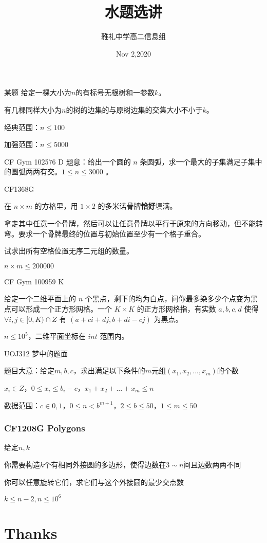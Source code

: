 \documentclass[9pt]{beamer}
\title{水题选讲}
\date{Nov 2,2020}
\author{雅礼中学高二信息组}
\begin{document}
  \maketitle
  \begin{frame}{某题}
	给定一棵大小为$n$的有标号无根树和一参数$k$。
	
  有几棵同样大小为$n$的树的边集的与原树边集的交集大小不小于$k$。

	经典范围：$n\le 100$

	加强范围：$n\le 5000$
  \end{frame}

  \begin{frame}{CF Gym 102576 D}
     题意：给出一个圆的 $n$ 条圆弧，求一个最大的子集满足子集中的圆弧两两有交。$1\le n \le 3000$ 。
  \end{frame}

  \begin{frame}{CF1368G}
    \par 在 $n\times m$ 的方格里，用 $1\times2$ 的多米诺骨牌\textbf{恰好}填满。
    \par 拿走其中任意一个骨牌，然后可以让任意骨牌以平行于原来的方向移动，但不能转弯。要求一个骨牌最终的位置与初始位置至少有一个格子重合。
    \par 试求出所有空格位置无序二元组的数量。
    \par $n\times m\le200000$ 
  \end{frame}

  \begin{frame}{CF Gym 100959 K}
    \par 给定一个二维平面上的 $n$ 个黑点，剩下的均为白点，问你最多染多少个点变为黑点可以形成一个正方形网格。一个 $K\times K$ 的正方形网格指，有实数 $a,b,c,d$ 使得 $\forall i,j\in[0,K)\cap Z$ 有 $(a+ci+dj,b+di-cj)$ 为黑点。 
    \par $n\leq 10^5$，二维平面坐标在 $int$ 范围内。
  \end{frame}

  \begin{frame}{UOJ312 梦中的题面}
    \par 题目大意：给定$m,b,c$，求出满足以下条件的$m$元组$(x_1,x_2,...,x_m)$的个数
    \par $x_i \in Z$，$0\leqslant x_i \leqslant b_{i}-c$，$x_1+x_2+...+x_m \leqslant n$
    \par 数据范围：$c\in{0,1}$，$0\leqslant n < b^{m+1}$，$2 \leqslant b \leqslant 50$，$1 \leqslant m \leqslant 50$
  \end{frame}
  
  \begin{frame}
		\frametitle{CF1208G Polygons}
		\par 给定$n,k$
		\par 你需要构造$k$个有相同外接圆的多边形，使得边数在$3\sim n$间且边数两两不同
		\par 你可以任意旋转它们，求它们与这个外接圆的最少交点数
		\par $k\le n-2,n\le 10^6$
	\end{frame}
  \section{Thanks}
\end{document}

